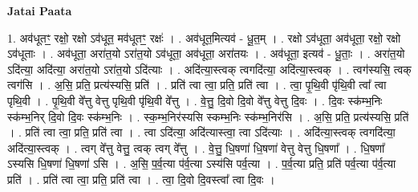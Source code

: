 \documentclass[17pt]{extarticle}
\begin{document}
\textbf{Jatai Paata} \newline

1. अव॑धूतꣳ॒॒ रक्षो॒ रक्षो ऽव॑धूत॒ मव॑धूतꣳ॒॒ रक्षः॑ । . अव॑धूत॒मित्यव॑ - धू॒त॒म् । . रक्षो ऽव॑धूता॒ अव॑धूता॒ रक्षो॒ रक्षो ऽव॑धूताः । . अव॑धूता॒ अरा॑त॒यो ऽरा॑त॒यो ऽव॑धूता॒ अव॑धूता॒ अरा॑तयः । . अव॑धूता॒ इत्यव॑ - धू॒ताः॒ । . अरा॑त॒यो ऽदि॑त्या॒ अदि॑त्या॒ अरा॑त॒यो ऽरा॑त॒यो ऽदि॑त्याः । . अदि॑त्या॒स्त्वक् त्वगदि॑त्या॒ अदि॑त्या॒स्त्वक् । . त्वग॑स्यसि॒ त्वक् त्वग॑सि । . अ॒सि॒ प्रति॒ प्रत्य॑स्यसि॒ प्रति॑ । . प्रति॑ त्वा त्वा॒ प्रति॒ प्रति॑ त्वा । . त्वा॒ पृ॒थि॒वी पृ॑थि॒वी त्वा᳚ त्वा पृथि॒वी । . पृ॒थि॒वी वे᳚त्तु वेत्तु पृथि॒वी पृ॑थि॒वी वे᳚त्तु । . वे॒त्तु॒ दि॒वो दि॒वो वे᳚त्तु वेत्तु दि॒वः । . दि॒वः स्क॑म्भ॒निः स्क॑म्भ॒निर् दि॒वो दि॒वः स्क॑म्भ॒निः । . स्क॒म्भ॒निर॑स्यसि स्कम्भ॒निः स्क॑म्भ॒निर॑सि । . अ॒सि॒ प्रति॒ प्रत्य॑स्यसि॒ प्रति॑ । . प्रति॑ त्वा त्वा॒ प्रति॒ प्रति॑ त्वा । . त्वा ऽदि॑त्या॒ अदि॑त्यास्त्वा॒ त्वा ऽदि॑त्याः । . अदि॑त्या॒स्त्वक् त्वगदि॑त्या॒ अदि॑त्या॒स्त्वक् । . त्वग् वे᳚त्तु वेत्तु॒ त्वक् त्वग् वे᳚त्तु । . वे॒त्तु॒ धि॒षणा॑ धि॒षणा॑ वेत्तु वेत्तु धि॒षणा᳚ । . धि॒षणा᳚ ऽस्यसि धि॒षणा॑ धि॒षणा॑ ऽसि । . अ॒सि॒ प॒र्व॒त्या प॑र्व॒त्या ऽस्य॑सि पर्व॒त्या । . प॒र्व॒त्या प्रति॒ प्रति॑ पर्व॒त्या प॑र्व॒त्या प्रति॑ । . प्रति॑ त्वा त्वा॒ प्रति॒ प्रति॑ त्वा । . त्वा॒ दि॒वो दि॒वस्त्वा᳚ त्वा दि॒वः । \newline
\end{document}
